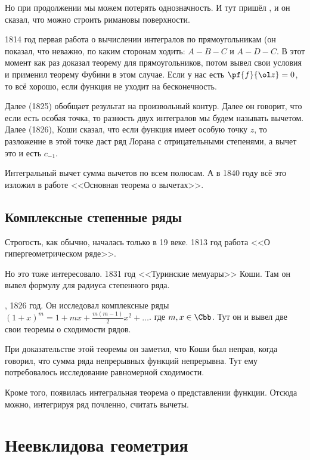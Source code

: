 \documentclass[a4paper,oneside,fleqn,10pt]{article}
\begin{document}
Но при продолжении мы можем потерять однозначность. И тут пришёл ,
и он сказал, что можно строить римановы поверхности.

1814 год первая работа  о вычислении интегралов по прямоугольникам
(он показал, что неважно, по каким сторонам ходить: $A{-}B{-}C$ и $A{-}D{-}C$.
В этот момент  как раз доказал теорему  для прямоугольников,
потом  вывел свои условия и применил теорему Фубини
в этом случае. Если у нас есть $\pf{f}{\ol z} = 0$, то всё хорошо,
если функция не уходит на бесконечность.

Далее (1825)  обобщает результат на произвольный контур. Далее он говорит,
что если есть особая точка, то разность двух интегралов мы будем называть
вычетом. Далее (1826), Коши сказал, что если функция имеет особую точку $z$, то разложение в этой
точке даст ряд Лорана с отрицательными степенями, а вычет это и есть $c_{-1}$.

Интегральный вычет сумма вычетов по всем полюсам. А в 1840 году
 всё это изложил в работе <<Основная теорема о вычетах>>.

\subsection{Комплексные степенные ряды}

Строгость, как обычно, началась только в 19 веке.
1813 год работа  <<О гипергеометрическом ряде>>.

Но  это тоже интересовало.
1831 год <<Туринские мемуары>> Коши. Там он вывел формулу  
для радиуса степенного ряда.

, 1826 год. Он исследовал комплексные ряды
$(1 +x )^m = 1 + mx + \frac{m(m-1)}{2} x^2 + \dots$.
где $m,x \in \Cbb$. Тут он и вывел две свои теоремы о сходимости рядов.

При доказательстве этой теоремы он заметил, что Коши был неправ, когда говорил, что сумма
ряда непрерывных функций непрерывна. Тут ему потребовалось исследование равномерной сходимости.

Кроме того, появилась интегральная теорема  о представлении функции.
Отсюда можно, интегрируя ряд почленно, считать вычеты.


\section{Неевклидова геометрия}
\end{document}
